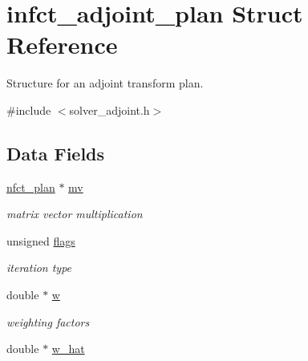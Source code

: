 \hypertarget{structinfct__adjoint__plan}{\section{infct\-\_\-adjoint\-\_\-plan Struct Reference}
\label{structinfct__adjoint__plan}
}


Structure for an adjoint transform plan.  




{\ttfamily \#include $<$solver\-\_\-adjoint.\-h$>$}

\subsection*{Data Fields}
\begin{DoxyCompactItemize}
\item 
\hypertarget{structinfct__adjoint__plan_a65d97330deb4cd9de78e4b9aa85afa62}{\hyperlink{structnfct__plan}{nfct\-\_\-plan} $\ast$ \hyperlink{structinfct__adjoint__plan_a65d97330deb4cd9de78e4b9aa85afa62}{mv}}\label{structinfct__adjoint__plan_a65d97330deb4cd9de78e4b9aa85afa62}

\begin{DoxyCompactList}\small\item\em matrix vector multiplication \end{DoxyCompactList}\item 
\hypertarget{structinfct__adjoint__plan_ad913ef9fc7d9bb8ca4f91f1abbf99949}{unsigned \hyperlink{structinfct__adjoint__plan_ad913ef9fc7d9bb8ca4f91f1abbf99949}{flags}}\label{structinfct__adjoint__plan_ad913ef9fc7d9bb8ca4f91f1abbf99949}

\begin{DoxyCompactList}\small\item\em iteration type \end{DoxyCompactList}\item 
\hypertarget{structinfct__adjoint__plan_add093d84bfb7f6f5d5b5512e000efc68}{double $\ast$ \hyperlink{structinfct__adjoint__plan_add093d84bfb7f6f5d5b5512e000efc68}{w}}\label{structinfct__adjoint__plan_add093d84bfb7f6f5d5b5512e000efc68}

\begin{DoxyCompactList}\small\item\em weighting factors \end{DoxyCompactList}\item 
\hypertarget{structinfct__adjoint__plan_af14d4eb49aee59948ea57d30dbf4d628}{double $\ast$ \hyperlink{structinfct__adjoint__plan_af14d4eb49aee59948ea57d30dbf4d628}{w\-\_\-hat}}\label{structinfct__adjoint__plan_af14d4eb49aee59948ea57d30dbf4d628}


\end{DoxyCompactItemize}
